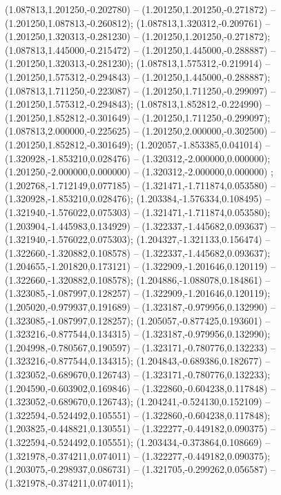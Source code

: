  (1.087813,1.201250,-0.202780) -- (1.201250,1.201250,-0.271872) -- (1.201250,1.087813,-0.260812);
 (1.087813,1.320312,-0.209761) -- (1.201250,1.320313,-0.281230) -- (1.201250,1.201250,-0.271872);
 (1.087813,1.445000,-0.215472) -- (1.201250,1.445000,-0.288887) -- (1.201250,1.320313,-0.281230);
 (1.087813,1.575312,-0.219914) -- (1.201250,1.575312,-0.294843) -- (1.201250,1.445000,-0.288887);
 (1.087813,1.711250,-0.223087) -- (1.201250,1.711250,-0.299097) -- (1.201250,1.575312,-0.294843);
 (1.087813,1.852812,-0.224990) -- (1.201250,1.852812,-0.301649) -- (1.201250,1.711250,-0.299097);
 (1.087813,2.000000,-0.225625) -- (1.201250,2.000000,-0.302500) -- (1.201250,1.852812,-0.301649);
 (1.202057,-1.853385,0.041014) -- (1.320928,-1.853210,0.028476) -- (1.320312,-2.000000,0.000000);
 (1.201250,-2.000000,0.000000) -- (1.320312,-2.000000,0.000000) ;
 (1.202768,-1.712149,0.077185) -- (1.321471,-1.711874,0.053580) -- (1.320928,-1.853210,0.028476);
 (1.203384,-1.576334,0.108495) -- (1.321940,-1.576022,0.075303) -- (1.321471,-1.711874,0.053580);
 (1.203904,-1.445983,0.134929) -- (1.322337,-1.445682,0.093637) -- (1.321940,-1.576022,0.075303);
 (1.204327,-1.321133,0.156474) -- (1.322660,-1.320882,0.108578) -- (1.322337,-1.445682,0.093637);
 (1.204655,-1.201820,0.173121) -- (1.322909,-1.201646,0.120119) -- (1.322660,-1.320882,0.108578);
 (1.204886,-1.088078,0.184861) -- (1.323085,-1.087997,0.128257) -- (1.322909,-1.201646,0.120119);
 (1.205020,-0.979937,0.191689) -- (1.323187,-0.979956,0.132990) -- (1.323085,-1.087997,0.128257);
 (1.205057,-0.877425,0.193601) -- (1.323216,-0.877544,0.134315) -- (1.323187,-0.979956,0.132990);
 (1.204998,-0.780567,0.190597) -- (1.323171,-0.780776,0.132233) -- (1.323216,-0.877544,0.134315);
 (1.204843,-0.689386,0.182677) -- (1.323052,-0.689670,0.126743) -- (1.323171,-0.780776,0.132233);
 (1.204590,-0.603902,0.169846) -- (1.322860,-0.604238,0.117848) -- (1.323052,-0.689670,0.126743);
 (1.204241,-0.524130,0.152109) -- (1.322594,-0.524492,0.105551) -- (1.322860,-0.604238,0.117848);
 (1.203825,-0.448821,0.130551) -- (1.322277,-0.449182,0.090375) -- (1.322594,-0.524492,0.105551);
 (1.203434,-0.373864,0.108669) -- (1.321978,-0.374211,0.074011) -- (1.322277,-0.449182,0.090375);
 (1.203075,-0.298937,0.086731) -- (1.321705,-0.299262,0.056587) -- (1.321978,-0.374211,0.074011);
